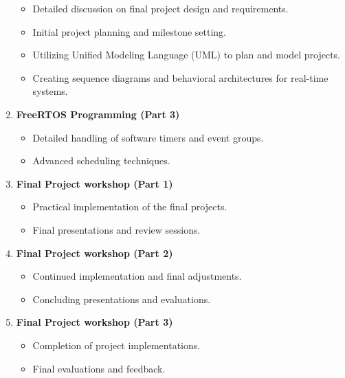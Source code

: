 \begin{enumerate}[label=\textbf{Week \arabic*:}]
\begin{itemize}
  \item Detailed discussion on final project design and requirements.
  \item Initial project planning and milestone setting.
  \item Utilizing Unified Modeling Language (UML) to plan and model projects.
  \item Creating sequence diagrams and behavioral architectures for real-time systems.
\end{itemize}
\item \textbf{ FreeRTOS Programming (Part 3) }
\begin{itemize}
  \item Detailed handling of software timers and event groups.
  \item Advanced scheduling techniques.
\end{itemize}
\item \textbf{ Final Project workshop (Part 1) }
\begin{itemize}
  \item Practical implementation of the final projects.
  \item Final presentations and review sessions.
\end{itemize}
\item \textbf{ Final Project workshop (Part 2) }
\begin{itemize}
  \item Continued implementation and final adjustments.
  \item Concluding presentations and evaluations.
\end{itemize}
\item \textbf{ Final Project workshop (Part 3) }
\begin{itemize}
  \item Completion of project implementations.
  \item Final evaluations and feedback.
\end{itemize}
\end{enumerate}
